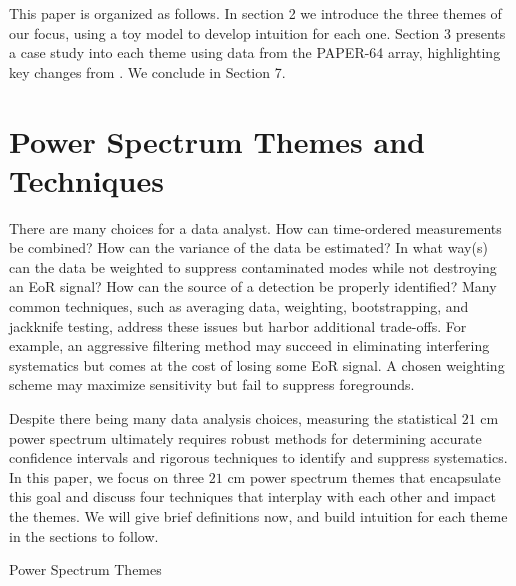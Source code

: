 \documentclass[preprint2,numberedappendix,tighten]{aastex6}  %
\begin{document}
This paper is organized as follows. In section 2 we introduce the three themes of our focus, using a toy model to develop intuition for each one. Section 3 presents a case study into each theme using data from the PAPER-64 array, highlighting key changes from \citet{ali_et_al2015}. We conclude in Section 7.

\section{Power Spectrum Themes and Techniques}
\label{sec:Themes}

There are many choices for a data analyst. How can time-ordered measurements be combined? How can the variance of the data be estimated? In what way(s) can the data be weighted to suppress contaminated modes while not destroying an EoR signal? How can the source of a detection be properly identified? Many common techniques, such as averaging data, weighting, bootstrapping, and jackknife testing, address these issues but harbor additional trade-offs. For example, an aggressive filtering method may succeed in eliminating interfering systematics but comes at the cost of losing some EoR signal. A chosen weighting scheme may maximize sensitivity but fail to suppress foregrounds. 

Despite there being many data analysis choices, measuring the statistical $21$ cm power spectrum ultimately requires robust methods for determining accurate confidence intervals and rigorous techniques to identify and suppress systematics.  In this paper, we focus on three $21$ cm power spectrum themes that encapsulate this goal and discuss four techniques that interplay with each other and impact the themes. We will give brief definitions now, and build intuition for each theme in the sections to follow.

\begin{center}
Power Spectrum Themes
\end{center}
\end{document}
